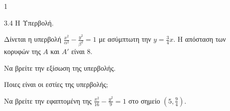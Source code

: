 \begin{ylh}{1}
    \item 3.4 Η Υπερβολή.
\end{ylh}
Δίνεται η υπερβολή $\frac{x^2}{\alpha^2} - \frac{y^2}{\beta^2} = 1$ με ασύμπτωτη την $y = \frac{3}{4}x$. Η απόσταση των κορυφών της $A$ και $A'$ είναι 8.
\begin{alist}
\item
    \begin{rlist}
    \item Να βρείτε την εξίσωση της υπερβολής. 
    \item Ποιες είναι οι εστίες της υπερβολής; 
    \end{rlist}
\item Να βρείτε την εφαπτομένη της $\frac{x^2}{16} - \frac{y^2}{9} = 1$ στο σημείο $\left(5, \frac{9}{4}\right)$. 
\end{alist}